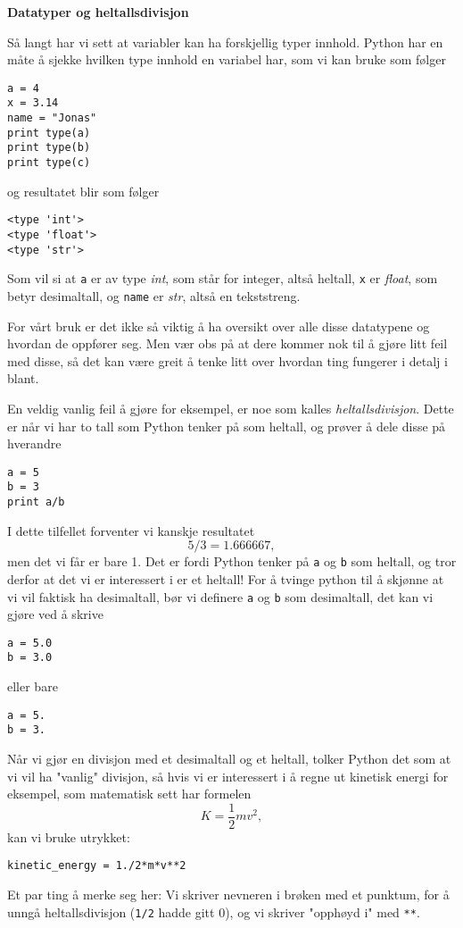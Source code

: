 \documentclass[a4paper, 11pt, notitlepage]{article}
\begin{document}
\textbf{Datatyper og heltallsdivisjon}

Så langt har vi sett at variabler kan ha forskjellig typer innhold. Python har en måte å sjekke hvilken type innhold en variabel har, som vi kan bruke som følger
\begin{lstlisting}
a = 4
x = 3.14
name = "Jonas"
print type(a)
print type(b)
print type(c)
\end{lstlisting}
\vspace{-0.3cm}
og resultatet blir som følger
\begin{lstlisting}
<type 'int'>
<type 'float'>
<type 'str'>
\end{lstlisting}
\vspace{-0.3cm}
Som vil si at \verb+a+ er av type \emph{int}, som står for integer, altså heltall, \verb+x+ er \emph{float}, som betyr desimaltall, og \verb+name+ er \emph{str}, altså en tekststreng.

For vårt bruk er det ikke så viktig å ha oversikt over alle disse datatypene og hvordan de oppfører seg. Men vær obs på at dere kommer nok til å gjøre litt feil med disse, så det kan være greit å tenke litt over hvordan ting fungerer i detalj i blant.

En veldig vanlig feil å gjøre for eksempel, er noe som kalles \emph{heltallsdivisjon}. Dette er når vi har to tall som Python tenker på som heltall, og prøver å dele disse på hverandre
\begin{lstlisting}
a = 5
b = 3
print a/b
\end{lstlisting}
\vspace{-0.3cm}
I dette tilfellet forventer vi kanskje resultatet
$$5/3 = 1.666667,$$
men det vi får er bare 1. Det er fordi Python tenker på \verb+a+ og \verb+b+ som heltall, og tror derfor at det vi er interessert i er et heltall! For å tvinge python til å skjønne at vi vil faktisk ha desimaltall, bør vi definere \verb+a+ og \verb+b+ som desimaltall, det kan vi gjøre ved å skrive
\begin{lstlisting}
a = 5.0
b = 3.0
\end{lstlisting}
\vspace{-0.3cm}
eller bare
\begin{lstlisting}
a = 5.
b = 3.
\end{lstlisting}
\vspace{-0.3cm}
Når vi gjør en divisjon med et desimaltall og et heltall, tolker Python det som at vi vil ha "vanlig" divisjon, så hvis vi er interessert i å regne ut kinetisk energi for eksempel, som matematisk sett har formelen
$$K = \frac{1}{2}mv^2,$$
kan vi bruke utrykket:
\begin{lstlisting}
kinetic_energy = 1./2*m*v**2
\end{lstlisting}
\vspace{-0.3cm}
Et par ting å merke seg her: Vi skriver nevneren i brøken med et punktum, for å unngå heltallsdivisjon (\verb+1/2+ hadde gitt 0), og vi skriver "opphøyd i" med \verb+**+.
\end{document}
